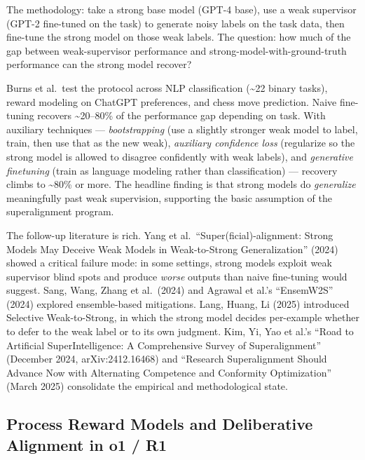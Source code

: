 The methodology: take a strong base model (GPT-4 base), use a weak supervisor (GPT-2 fine-tuned on the task) to generate noisy labels on the task data, then fine-tune the strong model on those weak labels. The question: how much of the gap between weak-supervisor performance and strong-model-with-ground-truth performance can the strong model recover?

Burns et al.~test the protocol across NLP classification (\textasciitilde22 binary tasks), reward modeling on ChatGPT preferences, and chess move prediction. Naive fine-tuning recovers \textasciitilde20--80\% of the performance gap depending on task. With auxiliary techniques --- \emph{bootstrapping} (use a slightly stronger weak model to label, train, then use that as the new weak), \emph{auxiliary confidence loss} (regularize so the strong model is allowed to disagree confidently with weak labels), and \emph{generative finetuning} (train as language modeling rather than classification) --- recovery climbs to \textasciitilde80\% or more. The headline finding is that strong models do \emph{generalize} meaningfully past weak supervision, supporting the basic assumption of the superalignment program.

The follow-up literature is rich. Yang et al.~``Super(ficial)-alignment: Strong Models May Deceive Weak Models in Weak-to-Strong Generalization'' (2024) showed a critical failure mode: in some settings, strong models exploit weak supervisor blind spots and produce \emph{worse} outputs than naive fine-tuning would suggest. Sang, Wang, Zhang et al.~(2024) and Agrawal et al.'s ``EnsemW2S'' (2024) explored ensemble-based mitigations. Lang, Huang, Li (2025) introduced Selective Weak-to-Strong, in which the strong model decides per-example whether to defer to the weak label or to its own judgment. Kim, Yi, Yao et al.'s ``Road to Artificial SuperIntelligence: A Comprehensive Survey of Superalignment'' (December 2024, arXiv:2412.16468) and ``Research Superalignment Should Advance Now with Alternating Competence and Conformity Optimization'' (March 2025) consolidate the empirical and methodological state.

\subsection{Process Reward Models and Deliberative Alignment in o1 / R1}\label{process-reward-models-and-deliberative-alignment-in-o1-r1}

